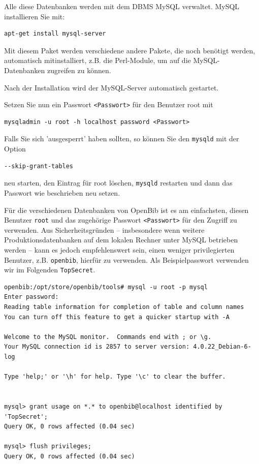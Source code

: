 \documentclass[11pt, twoside, a4paper, BCOR8mm, DIV12, bibtotoc,idxtotoc]{scrbook}
\begin{document}
Alle diese Datenbanken werden mit dem DBMS MySQL verwaltet. MySQL
installieren Sie mit:

\begin{verbatim}
apt-get install mysql-server
\end{verbatim}

Mit diesem Paket werden verschiedene andere Pakete, die noch benötigt
werden, automatisch mitinstalliert, z.B. die Perl-Module, um auf die
MySQL-Datenbanken zugreifen zu können.

Nach der Installation wird der MySQL-Server automatisch gestartet.

Setzen Sie nun ein Passwort \texttt{<Passwort>} für den Benutzer root mit

\begin{verbatim}
mysqladmin -u root -h localhost password <Passwort>
\end{verbatim}

Falls Sie sich 'ausgesperrt' haben sollten, so können Sie den
\texttt{mysqld} mit der Option
\begin{verbatim}
--skip-grant-tables
\end{verbatim}
neu starten, den Eintrag für root löschen, \texttt{mysqld} restarten
und dann das Passwort wie beschrieben neu setzen.

Für die verschiedenen Datenbanken von OpenBib ist es am einfachsten,
diesen Benutzer \texttt{root} und das zugehörige Passwort
\texttt{<Passwort>} für den Zugriff zu verwenden. Aus
Sicherheitsgründen -- insbesondere wenn weitere
Produktionsdatenbanken auf dem lokalen Rechner unter MySQL betrieben
werden -- kann es jedoch empfehlenswert sein, einen weniger
privilegierten Benutzer, z.B. \texttt{openbib}, hierfür zu verwenden.
Als Beispielpasswort verwenden wir im Folgenden \texttt{TopSecret}.


\begin{verbatim}
openbib:/opt/store/openbib/tools# mysql -u root -p mysql
Enter password:
Reading table information for completion of table and column names
You can turn off this feature to get a quicker startup with -A

Welcome to the MySQL monitor.  Commands end with ; or \g.
Your MySQL connection id is 2857 to server version: 4.0.22_Debian-6-log

Type 'help;' or '\h' for help. Type '\c' to clear the buffer.


mysql> grant usage on *.* to openbib@localhost identified by 'TopSecret';
Query OK, 0 rows affected (0.04 sec)

mysql> flush privileges;
Query OK, 0 rows affected (0.04 sec)
\end{verbatim}
\end{document}
